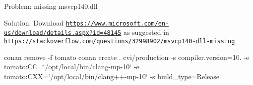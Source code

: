 \begin{DoxyItemize}
\item Problem\+: missing msvcp140.\+dll
\item Solution\+: Download \href{https://www.microsoft.com/en-us/download/details.aspx?id=48145}{\tt https\+://www.\+microsoft.\+com/en-\/us/download/details.\+aspx?id=48145} as suggested in \href{https://stackoverflow.com/questions/32998902/msvcp140-dll-missing}{\tt https\+://stackoverflow.\+com/questions/32998902/msvcp140-\/dll-\/missing}
\end{DoxyItemize}

conan remove -\/f tomato conan create . cvi/production -\/s compiler.\+version=10. -\/e tomato\+:CC=\char`\"{}/opt/local/bin/clang-\/mp-\/10\char`\"{} -\/e tomato\+:C\+XX=\char`\"{}/opt/local/bin/clang++-\/mp-\/10\char`\"{} -\/s build\+\_\+type=Release 
